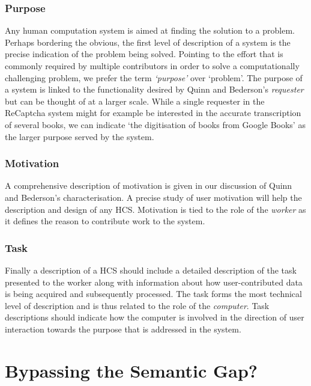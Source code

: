 \subsubsection{Purpose}

Any human computation system is aimed at finding the solution to a problem. Perhaps bordering the obvious, the first level of description of a system is the precise indication of the problem being solved. Pointing to the effort that is commonly required by multiple contributors in order to solve a computationally challenging problem, we prefer the term \emph{`purpose'} over `problem'. The purpose of a system is linked to the functionality desired by Quinn and Bederson's \emph{requester} but can be thought of at a larger scale. While a single requester in the ReCaptcha system might for example be interested in the accurate transcription of several books, we can indicate `the digitisation of books from Google Books' as the larger purpose served by the system.

\subsubsection{Motivation}

A comprehensive description of motivation is given in our discussion of Quinn and Bederson's characterisation. A precise study of user motivation will help the description and design of any HCS. Motivation is tied to the role of the \emph{worker} as it defines the reason to contribute work to the system.

\subsubsection{Task}

Finally a description of a HCS should include a detailed description of the task presented to the worker along with information about how user-contributed data is being acquired and subsequently processed. The task forms the most technical level of description and is thus related to the role of the \emph{computer}. Task descriptions should indicate how the computer is involved in the direction of user interaction towards the purpose that is addressed in the system.



\section{Bypassing the Semantic Gap?} %
\label{sec:bypassing_the_semantic_gap}

